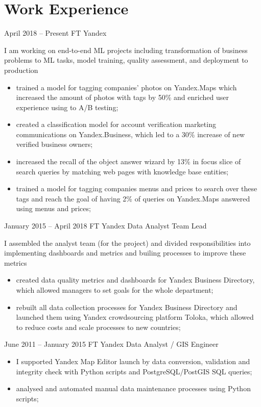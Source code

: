 \section{Work Experience}

\jobentry
    {April 2018 -- Present}
    {FT}
    {Yandex}
    {\currentPosition}
    {
        I am working on end-to-end ML projects including transformation of business problems to ML tasks, model training, quality assessment, and deployment to production
        \begin{itemize}
            \item trained a model for tagging companies' photos on Yandex.Maps which increased the amount of photos with tags by 50\% and enriched user experience using to A/B testing;
            \item created a classification model for account verification marketing communications on Yandex.Business, which led to a 30\% increase of new verified business owners;
            \item increased the recall of the object answer wizard by 13\% in focus slice of search queries by matching web pages with knowledge base entities;
            \item trained a model for tagging companies menus and prices to search over these tags and reach the goal of having 2\% of queries on Yandex.Maps answered using menus and prices;
        \end{itemize}
    }

\hrulefill

\jobentry
    {January 2015 -- April 2018}
    {FT}
    {Yandex}
    {Data Analyst Team Lead}
    {
        I assembled the analyst team (for the project) and divided responsibilities into implementing dashboards and metrics and builing processes to improve these metrics 
        \begin{itemize}
            \item created data quality metrics and dashboards for Yandex Business Directory, which allowed managers to set goals for the whole department;
            \item rebuilt all data collection processes for Yandex Business Directory and launched them using Yandex crowdsourcing platform Toloka, which allowed to reduce costs and scale processes to new countries;
        \end{itemize}
    }

\hrulefill

\jobentry
    {June 2011 -- January 2015}
    {FT}
    {Yandex}
    {Data Analyst / GIS Engineer}
    {
        \begin{itemize}[topsep=0pt]
            \item I supported Yandex Map Editor launch by data conversion, validation and integrity check with Python scripts and PostgreSQL/PostGIS SQL queries;
            \item analysed and automated manual data maintenance processes using Python scripts;
        \end{itemize}
    }
